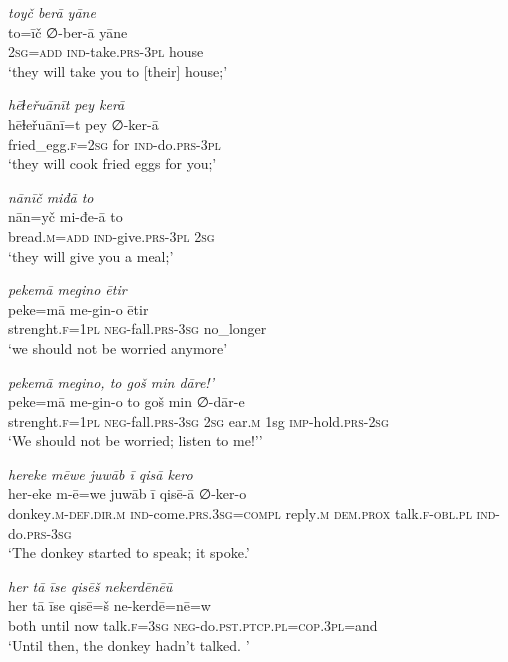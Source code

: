 \ea \label{HB.38}
\textit{toyč berā yāne} \\ 
\gll to=īč ∅-ber-ā yāne \\ 
 \textsc{2sg}\textsc{=add} \textsc{ind-}take\textsc{.prs}\textsc{-3pl} house \\ 
\glt `they will take you to [their] house;'
\z 
 
\ea \label{HB.39}
\textit{hēɫeřuānīt pey kerā} \\ 
\gll hēɫeřuānī=t pey ∅-ker-ā \\ 
 fried\_egg\textsc{\textsc{.f}}\textsc{=\textsc{2sg}} for \textsc{ind-}do\textsc{.prs}\textsc{-3pl} \\ 
\glt `they will cook fried eggs for you;'
\z 
 
\ea \label{HB.40}
\textit{nānīč miđā to} \\ 
\gll nān=yč mi-đe-ā to \\ 
 bread\textsc{.m}\textsc{=add} \textsc{ind-}give\textsc{.prs}\textsc{-3pl} \textsc{2sg} \\ 
\glt `they will give you a meal;'
\z 
 
\ea \label{HB.42}
\textit{pekemā megino ētir} \\ 
\gll peke=mā me-gin-o ētir \\ 
 strenght\textsc{\textsc{.f}}\textsc{=1pl} \textsc{neg-}fall\textsc{.prs}\textsc{-3sg} no\_longer \\ 
\glt `we should not be worried anymore'
\z 
 
\ea \label{HB.43}
\textit{pekemā megino, to goš min dāre!’} \\ 
\gll peke=mā me-gin-o to goš min ∅-dār-e \\ 
 strenght\textsc{\textsc{.f}}\textsc{=1pl} \textsc{neg-}fall\textsc{.prs}\textsc{-3sg} \textsc{2sg} ear\textsc{.m} 1sg \textsc{imp-}hold\textsc{.prs}-\textsc{2sg} \\ 
\glt `We should not be worried; listen to me!’'
\z 
 
\ea \label{HB.44}
\textit{hereke mēwe juwāb ī qisā kero} \\ 
\gll her-eke m-ē=we juwāb ī qisē-ā ∅-ker-o \\ 
 donkey\textsc{.m}\textsc{-def}\textsc{.dir}\textsc{.m} \textsc{ind-}come\textsc{.prs}\textsc{.3sg}\textsc{=compl} reply\textsc{.m} \textsc{dem.prox} talk\textsc{\textsc{.f}}\textsc{-obl}\textsc{.pl} \textsc{ind-}do\textsc{.prs}\textsc{-3sg} \\ 
\glt `The donkey started to speak; it spoke.'
\z 
 
\ea \label{HB.46}
\textit{her tā īse qisēš nekerdēnēū} \\ 
\gll her tā īse qisē=š ne-kerdē=nē=w \\ 
 both until now talk\textsc{\textsc{.f}}\textsc{=3sg} \textsc{neg-}do\textsc{.pst}\textsc{.ptcp}\textsc{.pl}\textsc{=cop}\textsc{.3pl}=and \\ 
\glt `Until then, the donkey hadn’t talked. '
\z 
 
